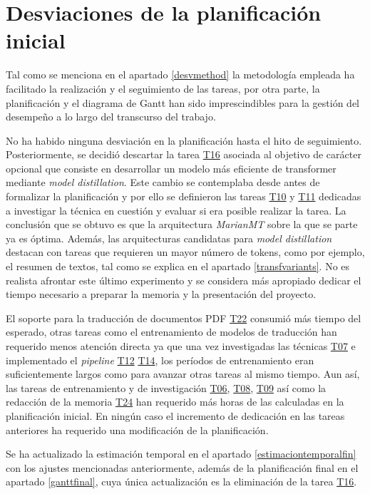\section{Desviaciones de la planificación inicial}\label{desviaplan}
Tal como se menciona en el apartado \ref{desvmethod} la metodología empleada ha facilitado la realización y el seguimiento de las tareas, por otra parte, la planificación y el diagrama de Gantt han sido imprescindibles para la gestión del desempeño a lo largo del transcurso del trabajo.

No ha habido ninguna desviación en la planificación hasta el hito de seguimiento. Posteriormente, se decidió descartar la tarea \hyperref[T16]{T16} asociada al objetivo de carácter opcional que consiste en desarrollar un modelo más eficiente de transformer mediante \textit{model distillation}. Este cambio se contemplaba desde antes de formalizar la planificación y por ello se definieron las tareas \hyperref[T10]{T10} y \hyperref[T11]{T11} dedicadas a investigar la técnica en cuestión y evaluar si era posible realizar la tarea.
La conclusión que se obtuvo es que la arquitectura \textit{MarianMT} sobre la que se parte ya es óptima. Además, las arquitecturas candidatas para \textit{model distillation} destacan con tareas que requieren un mayor número de tokens, como por ejemplo, el resumen de textos, tal como se explica en el apartado \ref{transfvariants}. No es realista afrontar este último experimento y se considera más apropiado dedicar el tiempo necesario a preparar la memoria y la presentación del proyecto.

El soporte para la traducción de documentos PDF \hyperref[T22]{T22} consumió más tiempo del esperado, otras tareas como el entrenamiento de modelos de traducción han requerido menos atención directa ya que una vez investigadas las técnicas \hyperref[T07]{T07} e implementado el \textit{pipeline} \hyperref[T12]{T12} \hyperref[T14]{T14}, los períodos de entrenamiento eran suficientemente largos como para avanzar otras tareas al mismo tiempo. Aun así, las tareas de entrenamiento y de investigación \hyperref[T06]{T06}, \hyperref[T08]{T08}, \hyperref[T09]{T09} así como la redacción de la memoria \hyperref[T24]{T24} han requerido más horas de las calculadas en la planificación inicial. En ningún caso el incremento de dedicación en las tareas anteriores ha requerido una modificación de la planificación.

Se ha actualizado la estimación temporal en el apartado \ref{estimaciontemporalfin} con los ajustes mencionadas anteriormente, además de la planificación final en el apartado \ref{ganttfinal}, cuya única actualización es la eliminación de la tarea \hyperref[T16]{T16}.



